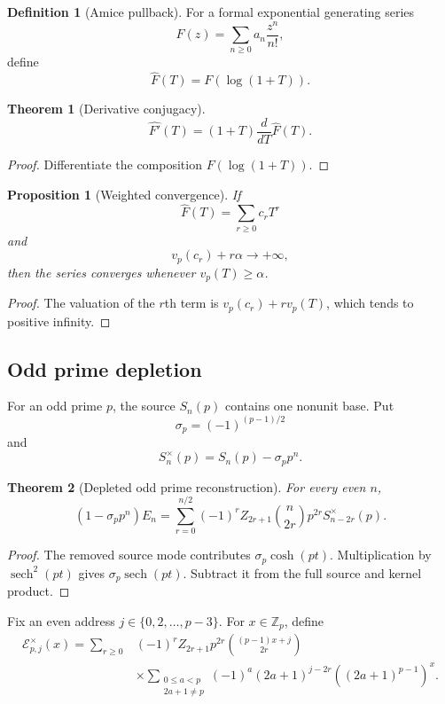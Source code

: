 \documentclass{aomart}
\newtheorem{theorem}{Theorem}[section]
\newtheorem{proposition}[proposition]{Proposition}
\theoremstyle{definition}
\newtheorem{definition}[definition]{Definition}
\theoremstyle{remark}
\newcommand{\Zp}{\mathbb Z_p}
\newcommand{\vp}{v_p}
\begin{document}
\begin{definition}[Amice pullback]\label{def:amice_pullback_unified}
For a formal exponential generating series
\[
F(z)=\sum_{n\geq0}a_n\frac{z^n}{n!},
\]
define
\[
\widehat F(T)=F(\log(1+T)).
\]
\end{definition}

\begin{theorem}[Derivative conjugacy]\label{thm:amice_derivative_unified}
\[
\boxed{
\widehat{F'}(T)
=
(1+T)\frac{d}{dT}\widehat F(T).
}
\]
\end{theorem}

\begin{proof}
Differentiate the composition \(F(\log(1+T))\).
\end{proof}

\begin{proposition}[Weighted convergence]\label{prop:amice_weighted_convergence_unified}
If
\[
\widehat F(T)=\sum_{r\geq0}c_rT^r
\]
and
\[
\vp(c_r)+r\alpha\longrightarrow+\infty,
\]
then the series converges whenever \(\vp(T)\geq\alpha\).
\end{proposition}

\begin{proof}
The valuation of the \(r\)th term is \(\vp(c_r)+r\vp(T)\), which tends to positive infinity.
\end{proof}

\subsection{Odd prime depletion}

For an odd prime \(p\), the source \(S_n(p)\) contains one nonunit base. Put
\[
\sigma_p=(-1)^{(p-1)/2}
\]
and
\[
S_n^\times(p)=S_n(p)-\sigma_pp^n.
\]

\begin{theorem}[Depleted odd prime reconstruction]\label{thm:depleted_odd_reconstruction}
For every even \(n\),
\[
\boxed{
\left(1-\sigma_pp^n\right)E_n
=
\sum_{r=0}^{n/2}
(-1)^rZ_{2r+1}
\binom n{2r}p^{2r}S_{n-2r}^\times(p).
}
\]
\end{theorem}

\begin{proof}
The removed source mode contributes \(\sigma_p\cosh(pt)\). Multiplication by \(\operatorname{sech}^2(pt)\) gives \(\sigma_p\operatorname{sech}(pt)\). Subtract it from the full source and kernel product.
\end{proof}

Fix an even address \(j\in\{0,2,\ldots,p-3\}\). For \(x\in\Zp\), define
\[
\begin{aligned}
\mathscr E_{p,j}^\times(x)
=
\sum_{r\geq0}
&(-1)^rZ_{2r+1}p^{2r}
\binom{(p-1)x+j}{2r}\\
&\times
\sum_{\substack{0\leq a<p\\2a+1\neq p}}
(-1)^a
(2a+1)^{j-2r}
\left((2a+1)^{p-1}\right)^x.
\end{aligned}
\]
\end{document}
